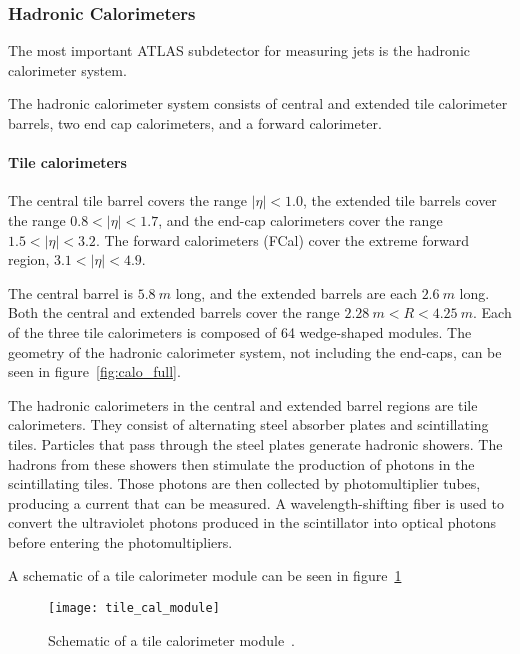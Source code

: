 \subsubsection{Hadronic Calorimeters}\label{subsubsec:had_cal}

The most important ATLAS subdetector for measuring jets is the hadronic calorimeter system.

The hadronic calorimeter system consists of central and extended tile calorimeter barrels, two end cap calorimeters,
and a forward calorimeter.

\paragraph{Tile calorimeters}

The central tile barrel covers the range $|\eta|<1.0$, the extended tile barrels cover the range $0.8 < |\eta| < 1.7$,
and the end-cap calorimeters cover the range $1.5 < |\eta| < 3.2$.
The forward calorimeters (FCal) cover the extreme forward region, $3.1 < |\eta| < 4.9$.

The central barrel is $5.8~m$ long, and the extended barrels are each $2.6~m$ long.
Both the central and extended barrels cover the range $2.28~m < R < 4.25~m$.
Each of the three tile calorimeters is composed of 64 wedge-shaped modules.
The geometry of the hadronic calorimeter system, not including the end-caps, can be seen in figure~\ref{fig:calo_full}.

The hadronic calorimeters in the central and extended barrel regions are tile calorimeters.
They consist of alternating steel absorber plates and scintillating tiles.
Particles that pass through the steel plates generate hadronic showers.
The hadrons from these showers then stimulate the production of photons in the scintillating tiles.
Those photons are then collected by photomultiplier tubes, producing a current that can be measured.
A wavelength-shifting fiber is used to convert the ultraviolet photons produced in the scintillator into optical photons
before entering the photomultipliers.

A schematic of a tile calorimeter module can be seen in figure~\ref{fig:tile_cal_module}

\begin{figure}[!ht]\centering
\texttt{[image: tile\_cal\_module]}
\caption{Schematic of a tile calorimeter module~\cite{atlas-detector-2008}.}
\label{fig:tile_cal_module}
\end{figure}

